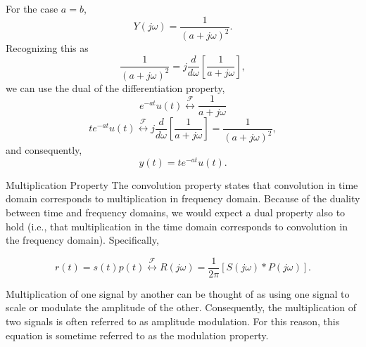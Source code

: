 \begin{frame}
    {
        For the case $a=b$,
        \begin{equation*}
            Y(j\omega) = \frac{1}{(a+j\omega)^2}.
        \end{equation*}
        \pause
        Recognizing this as
        \begin{equation*}
            \frac{1}{(a+j\omega)^2} = j\frac{d}{d\omega}\left[\frac{1}{a+j\omega}\right],
        \end{equation*}
        we can use the dual of the differentiation property,
        \begin{equation*}
            e^{-at}u(t) \overset{\mathcal{F}}{\longleftrightarrow} \frac{1}{a+j\omega}
        \end{equation*}
        \begin{equation*}
            te^{-at}u(t) \overset{\mathcal{F}}{\longleftrightarrow} j\frac{d}{d\omega}\left[\frac{1}{a+j\omega}\right] = \frac{1}{(a+j\omega)^2},
        \end{equation*}
        and consequently,
        \begin{equation*}
            y(t) = te^{-at}u(t).
        \end{equation*}
    }
\end{frame}



\begin{frame}{Multiplication Property}
    The convolution property states that convolution in \alert{time} domain corresponds to multiplication in \alert{frequency} domain. Because of the duality between time and frequency domains, we would expect a dual property also to hold (i.e., that multiplication in the time domain corresponds to convolution in the frequency domain). Specifically,

    \begin{equation*}
        r(t) = s(t)p(t) \overset{\mathcal{F}}{\longleftrightarrow} R(j\omega) = \frac{1}{2\pi}[S(j\omega)\ast P(j\omega)].
    \end{equation*}

    Multiplication of one signal by another can be thought of as using one signal to scale or \alert{modulate} the amplitude of the other. Consequently, the multiplication of two signals is often referred to as \alert{amplitude modulation}. For this reason, this equation is sometime referred to as the \alert{modulation property}.
\end{frame}

